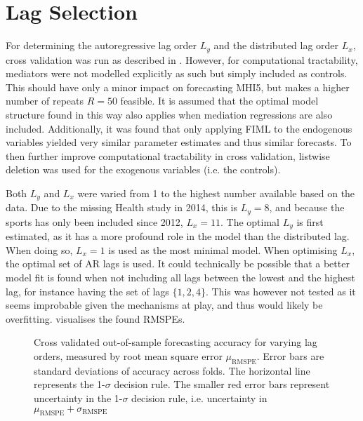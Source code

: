 \section{Lag Selection}
\label{sec:modelling:lags}
For determining the autoregressive lag order $L_y$ and the distributed lag order $L_x$, cross validation was run as
described in .
However, for computational tractability, mediators were not modelled explicitly as such but simply included as controls.
This should have only a minor impact on forecasting MHI5, but makes a higher number of repeats $R = 50$ feasible.
It is assumed that the optimal model structure found in this way also applies when mediation regressions are also
included.
Additionally, it was found that only applying FIML to the endogenous variables yielded very similar parameter estimates
and thus similar forecasts. To then further improve computational tractability in cross validation, listwise deletion
was used for the exogenous variables (i.e. the controls).

Both $L_y$ and $L_x$ were varied from 1 to the highest number available based on the data.
Due to the missing Health study in 2014, this is $L_y = 8$, and because the sports has only been included since 2012,
$L_x = 11$.
The optimal $L_y$ is first estimated, as it has a more profound role in the model than the distributed lag.
When doing so, $L_x = 1$ is used as the most minimal model. When optimising $L_x$, the optimal set of AR lags is used.
It could technically be possible that a better model fit is found when not including all lags between the lowest
and the highest lag, for instance having the set of lags $\{1, 2, 4\}$. This was however not tested as it seems improbable
given the mechanisms at play, and thus would likely be overfitting.
 visualises the found RMSPEs.

\begin{figure}[htbp]
    \centering
    \begin{subfigure}[t]{0.49\textwidth}
        \centering
        
        \vspace{0.1em}
    \end{subfigure}
    \hfill
    \begin{subfigure}[t]{0.49\textwidth}
        \centering
        
        \vspace{0.1em}
    \end{subfigure}
    \caption{Cross validated out-of-sample forecasting accuracy for varying lag orders, measured by root mean square error
    $\mu_{\text{RMSPE}}$.
    Error bars are standard deviations of accuracy across folds. The horizontal line represents the 1-$\sigma$ decision rule.
    The smaller red error bars represent uncertainty in the 1-$\sigma$ decision rule,
    i.e. uncertainty in $\mu_{\text{RMSPE}} + \sigma_{\text{RMSPE}}$}
    \label{fig:modelling:cv_lags}
\end{figure}

